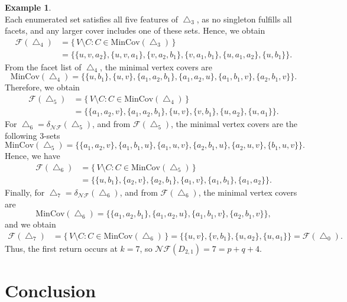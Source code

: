 \documentclass[12pt]{article}
\theoremstyle{plain}
\theoremstyle{definition}
\newtheorem{example}[theorem]{Example}
\newcommand{\F}{\mathcal{F}}
\newcommand{\MIN}{\mathrm{MinCov}}
\begin{document}
\begin{example}
\[			\]
			Each enumerated set satisfies all five features of \(\bigtriangleup_3\), as no singleton fulfills all facets, and any larger cover includes one of these sets.
			Hence, we obtain
			\begin{align*}
				\F(\bigtriangleup_4)
				&=\{\,V\setminus C: C\in\MIN(\bigtriangleup_3)\,\}\\
				&=\bigl\{\{u,v,a_2\},\{u,v,a_1\},\{v,a_2,b_1\},\{v,a_1,b_1\},\{u,a_1,a_2\},\{u,b_1\}\bigr\}.
			\end{align*}
			 From the facet list of \(\bigtriangleup_4\), the minimal vertex covers are
			\[
			\MIN(\bigtriangleup_4)=\{\{u,b_1\},\{u,v\},\{a_1,a_2,b_1\},\{a_1,a_2,u\},\{a_1,b_1,v\},\{a_2,b_1,v\}\}.
			\]
			Therefore, we obtain
			\begin{align*}
				\F(\bigtriangleup_5)
				&=\{\,V\setminus C: C\in\MIN(\bigtriangleup_4)\,\}\\
				&=\bigl\{\{a_1,a_2,v\},\{a_1,a_2,b_1\},\{u,v\},\{v,b_1\},\{u,a_2\},\{u,a_1\}\bigr\}.
			\end{align*}
			For \(\bigtriangleup_6=\delta_{\mathcal{NF}}(\bigtriangleup_5)\), and from \(\F(\bigtriangleup_5)\), the minimal vertex covers are the following \(3\)-sets
			\[
			\MIN(\bigtriangleup_5)=\{\{a_1,a_2,v\},\{a_1,b_1,u\},\{a_1,u,v\},\{a_2,b_1,u\},\{a_2,u,v\},\{b_1,u,v\}\}.
			\]
			Hence, we have
			\begin{align*}
				\F(\bigtriangleup_6)
				&=\{\,V\setminus C: C\in\MIN(\bigtriangleup_5)\,\}\\
				&=\bigl\{\{u,b_1\},\{a_2,v\},\{a_2,b_1\},\{a_1,v\},\{a_1,b_1\},\{a_1,a_2\}\bigr\}.
			\end{align*}
			Finally, for \(\bigtriangleup_7=\delta_{\mathcal{NF}}(\bigtriangleup_6)\), and from \(\F(\bigtriangleup_6)\), the minimal vertex covers are
			\[
			\MIN(\bigtriangleup_6)=\{\{a_1,a_2,b_1\},\{a_1,a_2,u\},\{a_1,b_1,v\},\{a_2,b_1,v\}\},
			\]
			and we obtain
			\begin{align*}
				\F(\bigtriangleup_7)
				&=\{\,V\setminus C: C\in\MIN(\bigtriangleup_6)\,\} =\bigl\{\{u,v\},\{v,b_1\},\{u,a_2\},\{u,a_1\}\bigr\}
				=\F(\bigtriangleup_0).
			\end{align*}
			Thus, the first return occurs at \(k=7\), so \(\mathcal{NF}(D_{2,1})=7=p+q+4\).
		\end{example}
		
	
	\section{Conclusion}
	
\end{document}
